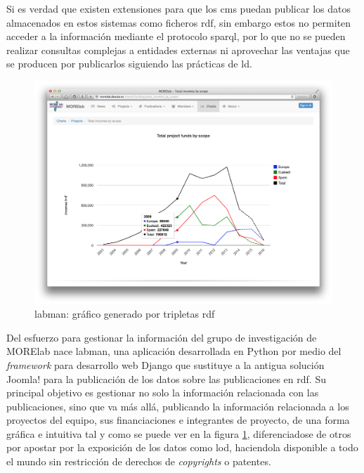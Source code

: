 Si es verdad que existen extensiones para que los \acrshort{cms} puedan publicar los datos almacenados en estos sistemas como ficheros \acrfull{rdf}, sin embargo estos no permiten acceder a la información mediante el protocolo \acrshort{sparql}, por lo que no se pueden realizar consultas complejas a entidades externas ni aprovechar las ventajas que se producen por publicarlos siguiendo las prácticas de \acrfull{ld}\cite{ld_benefits}.

\begin{figure}[!htp]
	\centering
	\includegraphics[scale=0.21]{fig/labman-chart}
	\caption{\acrshort{labman}: gráfico generado por tripletas \acrshort{rdf}}\label{fig:labmanchart}
\end{figure}

Del esfuerzo para gestionar la información del grupo de investigación de MORElab nace \acrshort{labman}, una aplicación desarrollada en Python\cite{Python} por medio del \textit{framework} para desarrollo web Django\cite{Django} que sustituye a la antigua solución Joomla! para la publicación de los datos sobre las publicaciones en \acrfull{rdf}\cite{RDF}. Su principal objetivo es gestionar no solo la información relacionada con las publicaciones, sino que va más allá, publicando la información relacionada a los proyectos del equipo, sus financiaciones e integrantes de proyecto, de una forma gráfica e intuitiva tal y como se puede ver en la figura \ref{fig:labmanchart}, diferenciadose de otros  por apostar por la exposición de los datos como \acrlong{lod}\cite{linkeddata}, haciendola disponible a todo el mundo sin restricción de derechos de \textit{copyrights} o patentes.\cite{pena_visual_2014}